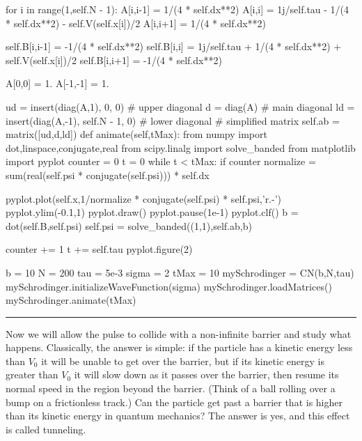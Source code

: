 \begin{enumerate}
\begin{codeexample}
\begin{VerbatimOut}{\listingFile}
        for i in range(1,self.N - 1):
            A[i,i-1] = 1/(4 * self.dx**2)
            A[i,i] = 1j/self.tau - 1/(4 * self.dx**2) - self.V(self.x[i])/2
            A[i,i+1] = 1/(4 * self.dx**2)

            self.B[i,i-1] = -1/(4 * self.dx**2)
            self.B[i,i] = 1j/self.tau + 1/(4 * self.dx**2) + self.V(self.x[i])/2
            self.B[i,i+1] = -1/(4 * self.dx**2)

        A[0,0] = 1.
        A[-1,-1] = 1.


        ud = insert(diag(A,1), 0, 0) # upper diagonal
        d = diag(A) # main diagonal
        ld = insert(diag(A,-1), self.N - 1, 0) # lower diagonal
        # simplified matrix
        self.ab = matrix([ud,d,ld])
    def animate(self,tMax):
        from numpy import dot,linspace,conjugate,real
        from scipy.linalg import solve_banded
        from matplotlib import pyplot
        counter = 0
        t = 0
        while t < tMax:
            if counter %
                normalize = sum(real(self.psi * conjugate(self.psi))) * self.dx
                
                pyplot.plot(self.x,1/normalize * conjugate(self.psi) * self.psi,'r.-')
                pyplot.ylim(-0.1,1)
                pyplot.draw()
                pyplot.pause(1e-1)
                pyplot.clf()
            b = dot(self.B,self.psi)
            self.psi = solve_banded((1,1),self.ab,b)

            counter += 1
            t += self.tau
        pyplot.figure(2)

b = 10
N = 200
tau = 5e-3
sigma = 2
tMax = 10
mySchrodinger = CN(b,N,tau)
mySchrodinger.initializeWaveFunction(sigma)
mySchrodinger.loadMatrices()
mySchrodinger.animate(tMax)


\end{VerbatimOut}
\end{codeexample}
\else
\noindent\rule{5 in}{0.01 in}
\fi



Now we will allow the pulse to collide with a non-infinite barrier and
study what happens. Classically, the answer is simple: if the particle
has a kinetic energy less than $V_0$ it will be unable to get over the
barrier, but if its kinetic energy is greater than $V_0$ it will slow
down as it passes over the barrier, then resume its normal speed in
the region beyond the barrier. (Think of a ball rolling over a bump on
a frictionless track.) Can the particle get past a barrier that is
higher than its kinetic energy in quantum mechanics? The answer is
yes, and this effect is called tunneling.


\end{enumerate}
